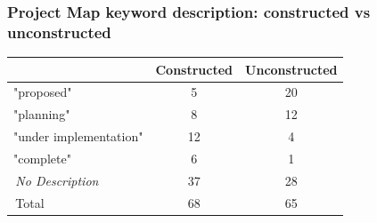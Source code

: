 \documentclass[aspectratio=32]{beamer}
\begin{document}
\begin{frame}

\end{frame}


\begin{frame}
\frametitle{Project Map keyword description: constructed vs unconstructed}
\begin{center}
\begin{tabular}{l*{1}{cc}}
 &Constructed &Unconstructed  \\
\hline 
"proposed"   &          5  &    20  \\
"planning"   &          8  &    12  \\
"under implementation"& 12 &     4  \\
"complete"   &          6  &     1  \\
$\,${\it No Description} &       37  &    28  \\ 
\hline $\,$Total &         68  &     65  \\
\hline
\end{tabular}
\end{center}
\end{frame}
\end{document}
